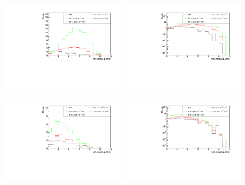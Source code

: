 \begin{figure}[h]
  \begin{center}
	\includegraphics[width=0.45\textwidth]{Plots/aQGC_kinematics/vbf_maxpt_jj_Deta_FS1.pdf}%
	\includegraphics[width=0.45\textwidth]{Plots/aQGC_kinematics/vbf_maxpt_jj_Deta_FS1_log.pdf}\\
    \caption{}
  \end{center}
\end{figure}
\begin{figure}[h]
  \begin{center}
	\includegraphics[width=0.45\textwidth]{Plots/aQGC_kinematics/vbf_maxpt_jj_Deta_FT0.pdf}%
	\includegraphics[width=0.45\textwidth]{Plots/aQGC_kinematics/vbf_maxpt_jj_Deta_FT0_log.pdf}\\
    \caption{}
  \end{center}
\end{figure}
